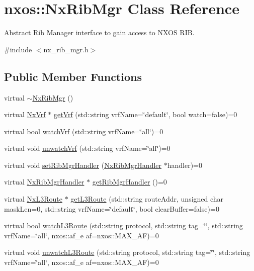 \hypertarget{classnxos_1_1NxRibMgr}{
\section{nxos::NxRibMgr Class Reference}
\label{classnxos_1_1NxRibMgr}
}


Abstract Rib Manager interface to gain access to NXOS RIB.  


{\ttfamily \#include $<$nx\_\-rib\_\-mgr.h$>$}\subsection*{Public Member Functions}
\begin{DoxyCompactItemize}
\item 
virtual \hyperlink{classnxos_1_1NxRibMgr_a5f390bcc244b9f5984d35290aea0e2cc}{$\sim$NxRibMgr} ()
\item 
virtual \hyperlink{classnxos_1_1NxVrf}{NxVrf} $\ast$ \hyperlink{classnxos_1_1NxRibMgr_a605323f1d764bc8c27fe770a9a6b4628}{getVrf} (std::string vrfName=\char`\"{}default\char`\"{}, bool watch=false)=0
\item 
virtual bool \hyperlink{classnxos_1_1NxRibMgr_a35e2a52be337d47cd111803f64aca904}{watchVrf} (std::string vrfName=\char`\"{}all\char`\"{})=0
\item 
virtual void \hyperlink{classnxos_1_1NxRibMgr_a957da78022cd4af95ee27941d0b67ce0}{unwatchVrf} (std::string vrfName=\char`\"{}all\char`\"{})=0
\item 
virtual void \hyperlink{classnxos_1_1NxRibMgr_ac42dd29e34f9c508614733dbec518b99}{setRibMgrHandler} (\hyperlink{classnxos_1_1NxRibMgrHandler}{NxRibMgrHandler} $\ast$handler)=0
\item 
virtual \hyperlink{classnxos_1_1NxRibMgrHandler}{NxRibMgrHandler} $\ast$ \hyperlink{classnxos_1_1NxRibMgr_aeed917ba912782303662c4009f3fcfcd}{getRibMgrHandler} ()=0
\item 
virtual \hyperlink{classnxos_1_1NxL3Route}{NxL3Route} $\ast$ \hyperlink{classnxos_1_1NxRibMgr_ae84cf1b9546fc3bf70e12bc7209ca190}{getL3Route} (std::string routeAddr, unsigned char maskLen=0, std::string vrfName=\char`\"{}default\char`\"{}, bool clearBuffer=false)=0
\item 
virtual bool \hyperlink{classnxos_1_1NxRibMgr_ab6749ea02f53fc8b2f6cdba21bbc335d}{watchL3Route} (std::string protocol, std::string tag=\char`\"{}\char`\"{}, std::string vrfName=\char`\"{}all\char`\"{}, nxos::af\_\-e af=nxos::MAX\_\-AF)=0
\item 
virtual void \hyperlink{classnxos_1_1NxRibMgr_a1dc61ed1d830f50ea947707576d75b99}{unwatchL3Route} (std::string protocol, std::string tag=\char`\"{}\char`\"{}, std::string vrfName=\char`\"{}all\char`\"{}, nxos::af\_\-e af=nxos::MAX\_\-AF)=0
\end{DoxyCompactItemize}


